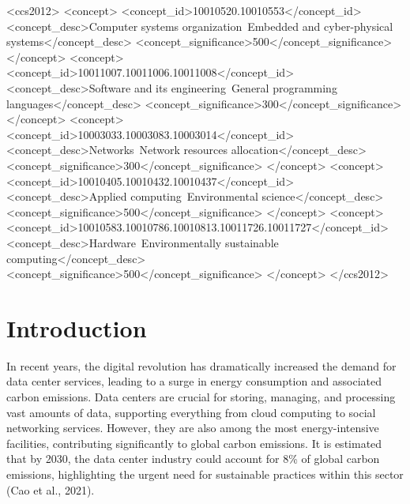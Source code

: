 \documentclass[acmlarge]{acmart}
\begin{document}
\begin{CCSXML}
	<ccs2012>
	<concept>
	<concept_id>10010520.10010553</concept_id>
	<concept_desc>Computer systems organization~Embedded and cyber-physical systems</concept_desc>
	<concept_significance>500</concept_significance>
	</concept>
	<concept>
	<concept_id>10011007.10011006.10011008</concept_id>
	<concept_desc>Software and its engineering~General programming languages</concept_desc>
	<concept_significance>300</concept_significance>
	</concept>
	<concept>
	<concept_id>10003033.10003083.10003014</concept_id>
	<concept_desc>Networks~Network resources allocation</concept_desc>
	<concept_significance>300</concept_significance>
	</concept>
	<concept>
	<concept_id>10010405.10010432.10010437</concept_id>
	<concept_desc>Applied computing~Environmental science</concept_desc>
	<concept_significance>500</concept_significance>
	</concept>
	<concept>
	<concept_id>10010583.10010786.10010813.10011726.10011727</concept_id>
	<concept_desc>Hardware~Environmentally sustainable computing</concept_desc>
	<concept_significance>500</concept_significance>
	</concept>
	</ccs2012>
\end{CCSXML}


	
	
	
	\maketitle
	
	\section{Introduction}
	In recent years, the digital revolution has dramatically increased the demand for data center services, leading to a surge in energy consumption and associated carbon emissions. Data centers are crucial for storing, managing, and processing vast amounts of data, supporting everything from cloud computing to social networking services. However, they are also among the most energy-intensive facilities, contributing significantly to global carbon emissions. It is estimated that by 2030, the data center industry could account for 8\% of global carbon emissions, highlighting the urgent need for sustainable practices within this sector (Cao et al., 2021).
\end{document}
